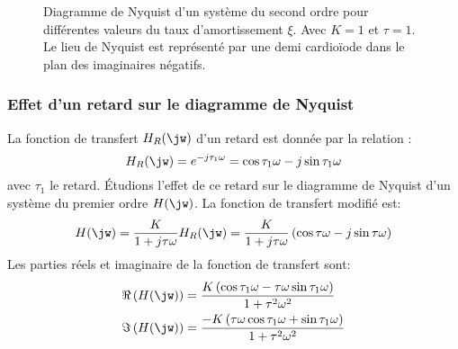 \begin{figure}[!h]
\begin{center}
\end{center}
\caption{Diagramme de Nyquist d'un système du second ordre pour différentes valeurs du 
    taux d'amortissement $\xi$. Avec $K=1$ et $\tau=1$. Le lieu de Nyquist est 
    représenté par une demi cardio\"iode dans le plan des imaginaires négatifs.\label{fig-nyquist_2nd_2}}
\end{figure}

\newpage
\subsubsection{Effet d'un retard sur le diagramme de Nyquist}
La fonction de transfert $H_R(\jw)$ d'un retard est donnée par la relation :
$$
H_R(\jw)=e^{-j\tau_1\omega}=\cos{\tau_1\omega}-j\sin{\tau_1\omega}
$$
avec $\tau_1$ le retard. 
\'Etudions l'effet de ce retard sur le diagramme de Nyquist d'un système du premier ordre $H(\jw)$.
La fonction de transfert modifié est:
$$
H(\jw)=\dfrac{K}{1+j\tau\omega}H_R(\jw)=\dfrac{K}{1+j\tau\omega}\left(\cos{\tau\omega}-j\sin{\tau\omega}\right)
$$
Les parties réels et imaginaire de la fonction de transfert sont:
\begin{align*}
    \Re\left(H(\jw)\right)&=\dfrac{K\left(\cos{\tau_1\omega-\tau\omega\sin{\tau_1\omega}}\right)}{1+\tau^2\omega^2}\\
    \Im\left(H(\jw)\right)&=\dfrac{-K\left(\tau\omega\cos{\tau_1\omega+\sin{\tau_1\omega}}\right)}{1+\tau^2\omega^2}\\
\end{align*}

